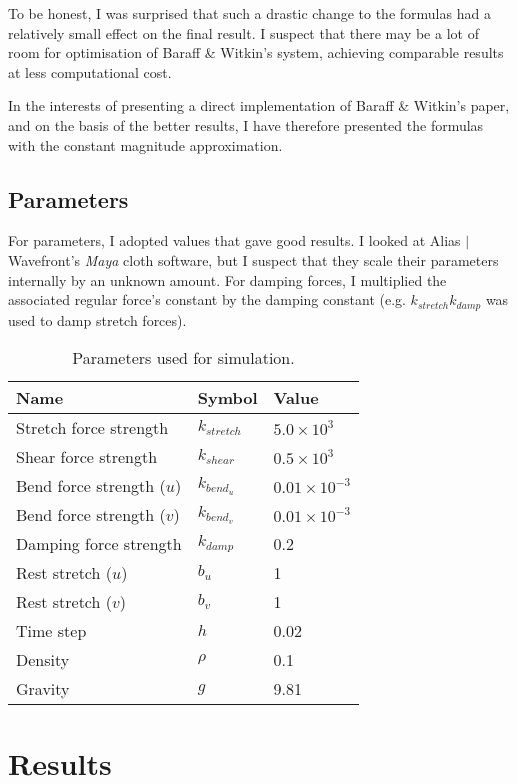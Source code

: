 \documentclass[twocolumn]{article}
\begin{document}
To be honest, I was surprised that such a drastic change to the formulas had
a relatively small effect on the final result. I suspect that there may be a
lot of room for optimisation of Baraff \& Witkin's system, achieving comparable
results at less computational cost.

In the interests of presenting a direct implementation of Baraff \& Witkin's
paper, and on the basis of the better results, I have therefore presented
the formulas with the constant magnitude approximation.

\subsection{Parameters}

For parameters, I adopted values that gave good results. I looked at
Alias $|$ Wavefront's {\it Maya} cloth software, but I suspect that they scale
their parameters internally by an unknown amount. For damping forces, I
multiplied the associated regular force's constant by the damping constant
(e.g. $k_{stretch} k_{damp}$ was used to damp stretch forces).

\begin{table}
\begin{center}
\begin{tabular}{|l|l|l|}
\hline 
{\bf Name} & {\bf Symbol} & {\bf Value} \\
\hline
Stretch force strength & $k_{stretch}$ & $5.0 \times 10^3$ \\
Shear force strength & $k_{shear}$ & $0.5 \times 10^3$ \\
Bend force strength ($u$) & $k_{bend_u}$ & $0.01 \times 10^{-3}$ \\
Bend force strength ($v$) & $k_{bend_v}$ & $0.01 \times 10^{-3}$ \\
Damping force strength & $k_{damp}$ & 0.2 \\
Rest stretch ($u$) & $b_u$ & 1 \\
Rest stretch ($v$) & $b_v$ & 1 \\
Time step & $h$ & 0.02 \\
Density & $\rho$ & 0.1 \\
Gravity & $g$ & 9.81 \\
\hline
\end{tabular}
\end{center}
\caption{Parameters used for simulation.}
\end{table}

\section{Results}
\end{document}
